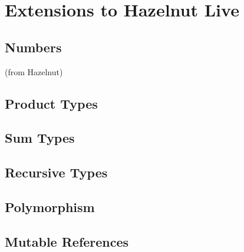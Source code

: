 \newcommand{\extensionsSec}{Extensions to Hazelnut Live}
\section{\protect\extensionsSec} %
\label{sec:extensions}

\subsection{Numbers}
(from Hazelnut)

\subsection{Product Types}

\subsection{Sum Types}


\subsection{Recursive Types}

\subsection{Polymorphism}

\subsection{Mutable References}

